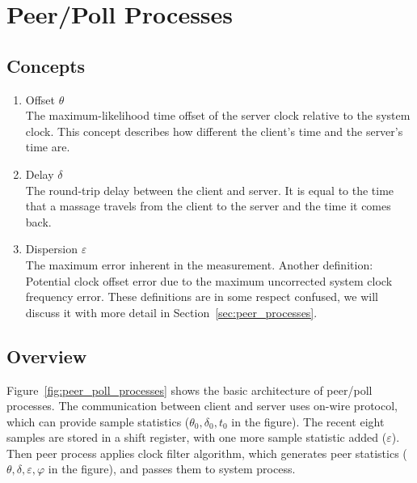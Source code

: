 \chapter{Peer/Poll Processes}
\label{cha:peer/poll}

\section{Concepts}%
\label{sec:peer/poll_concepts}
\begin{enumerate}
    \item Offset $\theta$\\
        The maximum-likelihood time offset of the server clock relative to the
        system clock. This concept describes how different the client's time
        and the server's time are.
    \item Delay $\delta$\\
        The round-trip delay between the client and server. It is equal to the
        time that a massage travels from the client to the server and the time
        it comes back.
    \item Dispersion $\varepsilon$\\
        The maximum error inherent in the measurement.
        Another definition: Potential clock offset error due to the maximum
        uncorrected system clock frequency error.
        These definitions are in some respect confused, we will discuss it with
        more detail in Section~\ref{sec:peer_processes}.
\end{enumerate}

\section{Overview}%
\label{sec:peer_poll_overview}
Figure~\ref{fig:peer_poll_processes} shows the basic architecture of peer/poll
processes. The communication between client and server uses on-wire protocol,
which can provide sample statistics ($\theta_0, \delta_0, t_0$ in the figure).
The recent eight samples are stored in a shift register, with one more sample
statistic added ($\varepsilon$).  Then peer process applies clock filter
algorithm, which generates peer statistics ($\theta, \delta, \varepsilon,
\varphi$ in the figure), and passes them to system process.

